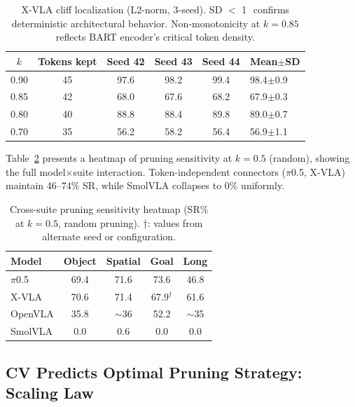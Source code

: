 \documentclass[10pt,letterpaper]{article}
\newcommand{\pp}{\,\text{pp}}
\begin{document}
\begin{table}[t]
\centering
\caption{X-VLA cliff localization (L2-norm, 3-seed). SD $<$ 1\pp\ confirms deterministic architectural behavior. Non-monotonicity at $k\!=\!0.85$ reflects BART encoder's critical token density.}
\label{tab:xvla_cliff}
\small
\begin{tabular}{cccccl}
\toprule
$k$ & Tokens kept & Seed 42 & Seed 43 & Seed 44 & Mean$\pm$SD \\
\midrule
0.90 & 45 & 97.6 & 98.2 & 99.4 & 98.4$\pm$0.9 \\
0.85 & 42 & 68.0 & 67.6 & 68.2 & 67.9$\pm$0.3 \\
0.80 & 40 & 88.8 & 88.4 & 89.8 & 89.0$\pm$0.7 \\
0.70 & 35 & 56.2 & 58.2 & 56.4 & 56.9$\pm$1.1 \\
\bottomrule
\end{tabular}
\end{table}

Table~\ref{tab:crosssuite_heatmap} presents a heatmap of pruning sensitivity at $k\!=\!0.5$ (random), showing the full model$\times$suite interaction. Token-independent connectors ($\pi$0.5, X-VLA) maintain 46--74\% SR, while SmolVLA collapses to 0\% uniformly.

\begin{table}[t]
\centering
\caption{Cross-suite pruning sensitivity heatmap (SR\% at $k\!=\!0.5$, random pruning). $\dagger$: values from alternate seed or configuration.}
\label{tab:crosssuite_heatmap}
\small
\begin{tabular}{lcccc}
\toprule
Model & Object & Spatial & Goal & Long \\
\midrule
$\pi$0.5 & 69.4 & 71.6 & 73.6 & 46.8 \\
X-VLA & 70.6 & 71.4 & 67.9$^\dagger$ & 61.6 \\
OpenVLA & 35.8 & $\sim$36 & 52.2 & $\sim$35 \\
SmolVLA & 0.0 & 0.6 & 0.0 & 0.0 \\
\bottomrule
\end{tabular}
\end{table}


\subsection{CV Predicts Optimal Pruning Strategy: Scaling Law}
\label{sec:scaling_law}
\end{document}
